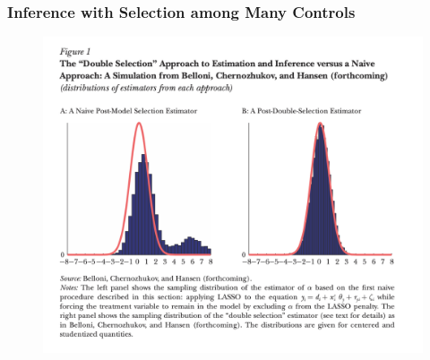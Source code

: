 \documentclass[
  shownotes,
  xcolor={svgnames},
  hyperref={colorlinks,citecolor=DarkBlue,linkcolor=DarkRed,urlcolor=DarkBlue}
  , aspectratio=169]{beamer}
\begin{document}
\begin{frame}[fragile]
\frametitle{Inference with Selection among Many Controls}

   \begin{figure}[H] \centering
            \captionsetup{justification=centering}
              \includegraphics[scale=0.30]{figures/fig1_belloni}
 \end{figure}


\end{frame}
\end{document}
